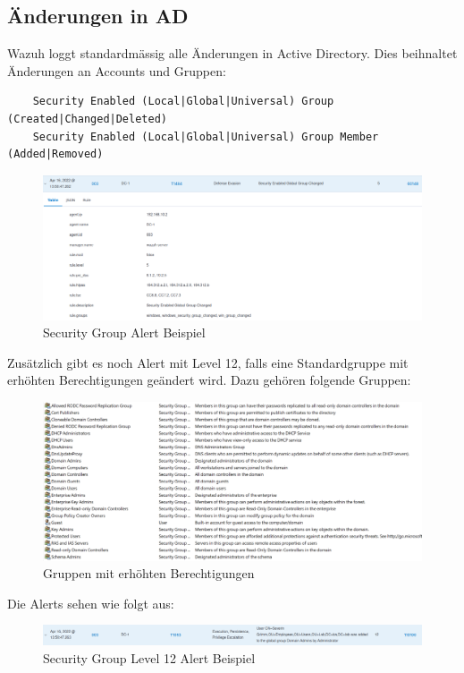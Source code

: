 \subsection{Änderungen in AD}
Wazuh loggt standardmässig alle Änderungen in Active Directory.
Dies beihnaltet Änderungen an Accounts und Gruppen:
\begin{lstlisting}
    Security Enabled (Local|Global|Universal) Group (Created|Changed|Deleted)
    Security Enabled (Local|Global|Universal) Group Member (Added|Removed)
\end{lstlisting}
\begin{figure}[H]
    \centering
    \includegraphics[width=0.7\linewidth]{../img/IAM/security-group-alert-example.png}
    \caption{Security Group Alert Beispiel}
\end{figure}

Zusätzlich gibt es noch Alert mit Level 12, falls eine Standardgruppe mit erhöhten Berechtigungen geändert wird.
Dazu gehören folgende Gruppen:
\begin{figure}[H]
    \centering
    \includegraphics[width=0.7\linewidth]{../img/IAM/high-privilege-groups.png}
    \caption{Gruppen mit erhöhten Berechtigungen}
\end{figure}
Die Alerts sehen wie folgt aus:
\begin{figure}[H]
    \centering
    \includegraphics[width=\linewidth]{../img/IAM/alert-added-to-privilege-group.png}
    \caption{Security Group Level 12 Alert Beispiel}
\end{figure}